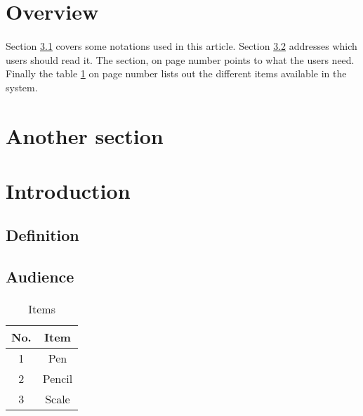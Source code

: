 \documentclass{article}
\begin{document}
	\section{Overview}
	\paragraph{}
	
	Section \ref{subsec:def} covers some notations used in this article. Section \ref{subsec:who} addresses which users should read it. The section,  on page number \pageref{subsec:reqs} points to what the users need. Finally the table \ref{tbl:items} on page number \pageref{tbl:items} lists out the different items available in the system.
	
	\section{Another section}
	\lipsum[1-4]
	
	\section{Introduction}
	\label{sec:intro}
	\paragraph{}
	
	\lipsum[1-2]
	
	\subsection{Definition}
	\label{subsec:def}
	\paragraph{}
	
	\lipsum[1-2]
	
	\subsection{Audience}
	\label{subsec:who}
	\paragraph{}
	
	\lipsum[1-2]
	
	\begin{table}[h]
		\centering
		\begin{tabular}{cc}
			\hline
			No. & Item\\
			\hline
			1 & Pen\\
			\hline
			2 & Pencil\\
			\hline
			3 & Scale\\
			\hline
		\end{tabular}
		
		\caption{Items}
		\label{tbl:items}
	\end{table}
	
\end{document}
